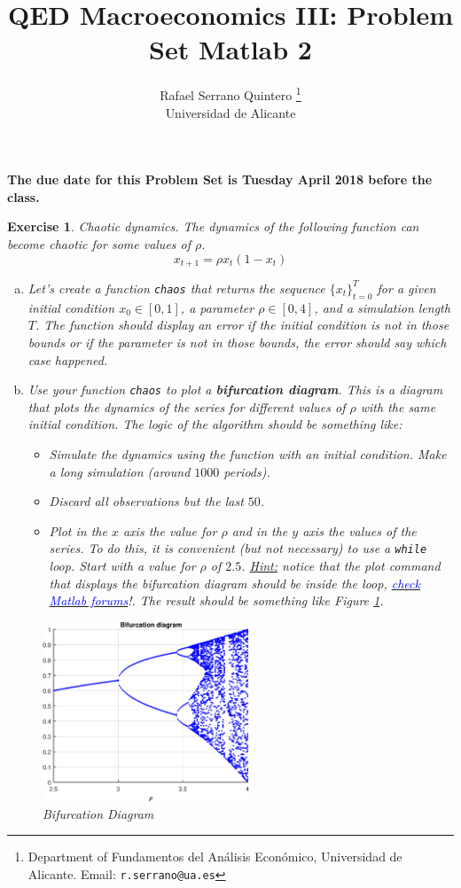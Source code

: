 \documentclass[a4paper,12pt]{article}
\title{\textbf{QED Macroeconomics III: Problem Set Matlab 2}}
\author{Rafael Serrano Quintero
\thanks{Department of Fundamentos del An{\'a}lisis Econ{\'o}mico, Universidad de Alicante. Email: \texttt{r.serrano@ua.es}} \\
Universidad de Alicante \\}
\date{}
\newtheorem{exercise}{Exercise}
\begin{document}
\maketitle

\textbf{The due date for this Problem Set is Tuesday  April 2018 before the class.} 

\begin{exercise}
Chaotic dynamics. The dynamics of the following function can become chaotic for some values of $\rho$.
	 \[
	 x_{t+1} = \rho x_t (1-x_t)
	 \]

\begin{enumerate}[a)]
		 \item Let's create a function \texttt{chaos} that returns the sequence $\{x_t\}_{t=0}^{T}$ for a given initial condition $x_0\in [0,1]$, a parameter $\rho\in [0,4]$, and a simulation length $T$. The function should display an error if the initial condition is not in those bounds or if the parameter is not in those bounds, the error should say \textit{which case happened}.
	 	 \item Use your function \texttt{chaos} to plot a \textbf{bifurcation diagram}. This is a diagram that plots the dynamics of the series for different values of $\rho$ with the same initial condition. The logic of the algorithm should be something like:	 
	 	 \begin{itemize}
		 	\item Simulate the dynamics using the function with an initial condition. Make a long simulation (around $1000$ periods).
	 		\item Discard all observations but the last $50$.
	 		\item Plot in the $x$ axis the value for $\rho$ and in the $y$ axis the values of the series. To do this, it is convenient (but not necessary) to use a \texttt{while} loop. Start with a value for $\rho$ of $2.5$. \underline{Hint:} notice that the plot command that displays the bifurcation diagram should be inside the loop, \href{https://www.mathworks.com/matlabcentral/answers/90680-plotting-in-a-for-loop}{\textcolor{blue}{check Matlab forums}}!. The result should be something like Figure \ref{bifurc}. 
	 	\end{itemize}
\end{enumerate}

\begin{figure}[htbp]
	\centering
		\includegraphics[width=0.55\textwidth]{bifurc.eps}
	\caption{Bifurcation Diagram}
	\label{bifurc}
\end{figure}
\end{exercise}
\end{document}

